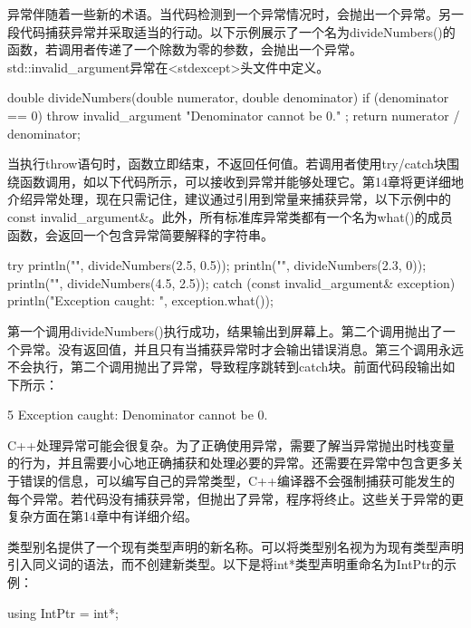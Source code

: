 异常伴随着一些新的术语。当代码检测到一个异常情况时，会抛出一个异常。另一段代码捕获异常并采取适当的行动。以下示例展示了一个名为divideNumbers()的函数，若调用者传递了一个除数为零的参数，会抛出一个异常。std::invalid\_argument异常在<stdexcept>头文件中定义。

\begin{cpp}
double divideNumbers(double numerator, double denominator)
{
    if (denominator == 0) {
        throw invalid_argument { "Denominator cannot be 0." };
    }
    return numerator / denominator;
}
\end{cpp}


当执行throw语句时，函数立即结束，不返回任何值。若调用者使用try/catch块围绕函数调用，如以下代码所示，可以接收到异常并能够处理它。第14章将更详细地介绍异常处理，现在只需记住，建议通过引用到常量来捕获异常，以下示例中的const invalid\_argument\&。此外，所有标准库异常类都有一个名为what()的成员函数，会返回一个包含异常简要解释的字符串。

\begin{cpp}
try {
    println("{}", divideNumbers(2.5, 0.5));
    println("{}", divideNumbers(2.3, 0));
    println("{}", divideNumbers(4.5, 2.5));
} catch (const invalid_argument& exception) {
    println("Exception caught: {}", exception.what());
}
\end{cpp}

第一个调用divideNumbers()执行成功，结果输出到屏幕上。第二个调用抛出了一个异常。没有返回值，并且只有当捕获异常时才会输出错误消息。第三个调用永远不会执行，第二个调用抛出了异常，导致程序跳转到catch块。前面代码段输出如下所示：

\begin{shell}
5
Exception caught: Denominator cannot be 0.
\end{shell}

C++处理异常可能会很复杂。为了正确使用异常，需要了解当异常抛出时栈变量的行为，并且需要小心地正确捕获和处理必要的异常。还需要在异常中包含更多关于错误的信息，可以编写自己的异常类型，C++编译器不会强制捕获可能发生的每个异常。若代码没有捕获异常，但抛出了异常，程序将终止。这些关于异常的更复杂方面在第14章中有详细介绍。


类型别名提供了一个现有类型声明的新名称。可以将类型别名视为为现有类型声明引入同义词的语法，而不创建新类型。以下是将int*类型声明重命名为IntPtr的示例：

\begin{cpp}
using IntPtr = int*;
\end{cpp}

